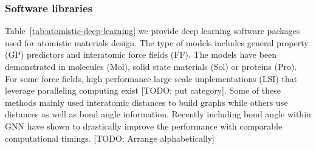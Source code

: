 \documentclass[pdflatex,sn-mathphys]{sn-jnl}%
\theoremstyle{thmstyleone}%
\theoremstyle{thmstyletwo}%
\theoremstyle{thmstylethree}%
\begin{document}
\subsubsection{Software libraries }
 Table~\ref{tab:atomistic-deep-learning} we provide deep learning software packages used for atomistic materials design. The type of models includes general property (GP) predictors and interatomic force fields (FF). The models have been demonstrated in molecules (Mol), solid state materials (Sol) or proteins (Pro). For some force fields, high performance large scale implementations (LSI) that leverage paralleling computing exist [TODO: put category]. Some of these methods mainly used interatomic distances to build graphs while others use distances as well as bond angle information. Recently including bond angle within GNN have shown to drastically improve the performance with comparable computational timings.
[TODO: Arrange alphabetically]
\end{document}
